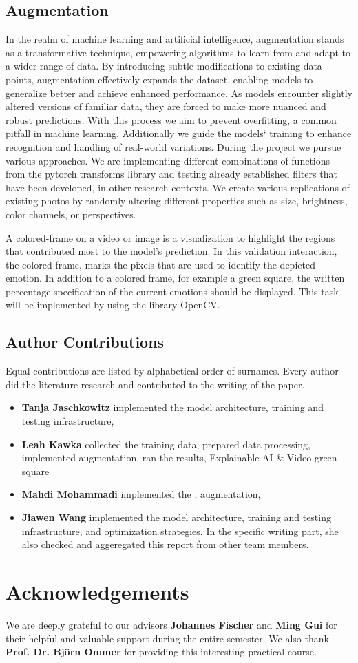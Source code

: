 \subsection{Augmentation}
\label{sec:optim:aug}
In the realm of machine learning and artificial intelligence, 
augmentation stands as a transformative technique, 
empowering algorithms to learn from and adapt to a wider range of data. 
By introducing subtle modifications to existing data points, 
augmentation effectively expands the dataset, 
enabling models to generalize better and achieve enhanced performance.
As models encounter slightly altered versions of familiar data, 
they are forced to make more nuanced and robust predictions. 
With this process we aim to prevent overfitting, 
a common pitfall in machine learning. 
Additionally we guide the models` training to enhance recognition and handling of real-world variations.
During the project we pursue various approaches. 
We are implementing different combinations of functions from the pytorch.transforms library and testing already established filters that have been developed, in other research contexts. 
We create various replications of existing photos by randomly altering different properties such as size, brightness, color channels, or perspectives.

A colored-frame on a video or image is a visualization to highlight the regions that contributed most to the model's prediction. 
 In this validation interaction, the colored frame, marks the pixels that are used to identify the depicted emotion. In addition to a colored frame, for example a green square, the written percentage specification of the current emotions should be displayed. This task will be implemented by using the library OpenCV.

\subsection*{Author Contributions}
\label{sec:author}
Equal contributions are listed by alphabetical order of surnames. 
Every author did the literature research and contributed to the writing of the paper. 

\begin{itemize}
  \item \textbf{Tanja Jaschkowitz} implemented the model architecture, training and testing infrastructure, 
  \item \textbf{Leah Kawka} collected the training data, prepared data processing, implemented augmentation, ran the results, 
  Explainable AI \& Video-green square
  \item \textbf{Mahdi Mohammadi} implemented the , augmentation, 
  \item \textbf{Jiawen Wang} implemented the model architecture, training and testing infrastructure, and optimization strategies. 
  In the specific writing part, she also checked and aggeregated this report from other team members.
\end{itemize}

\section*{Acknowledgements}

We are deeply grateful to our advisors \textbf{Johannes Fischer} and \textbf{Ming Gui} for their helpful and valuable support during the entire semester. 
We also thank \textbf{Prof. Dr. Björn Ommer} for providing this interesting practical course.
